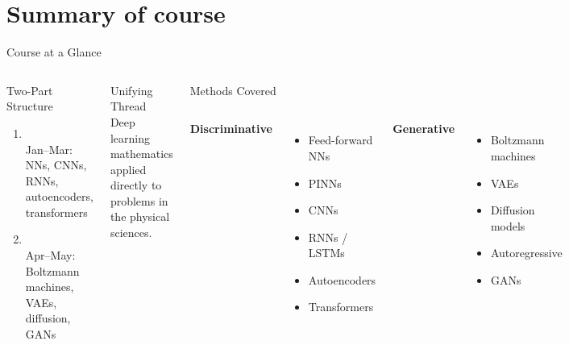 \documentclass[aspectratio=169,11pt]{beamer}
\begin{document}
\section{Summary of course}
\begin{frame}{Course at a Glance}
  \begin{columns}[T]
      \begin{block}{Two-Part Structure}
        \begin{enumerate}\itemsep2pt
          \item {}\\
                {\footnotesize Jan--Mar: NNs, CNNs, RNNs,
                autoencoders, transformers}
          \item {}\\
                {\footnotesize Apr--May: Boltzmann machines,
                VAEs, diffusion, GANs}
        \end{enumerate}
      \end{block}
      \vspace{3pt}
      \begin{alertblock}{Unifying Thread}
        Deep learning mathematics applied
        directly to problems in the physical sciences.
      \end{alertblock}
      \begin{block}{Methods Covered}
        \begin{columns}[T]
          {\small\textbf{Discriminative}}
          \begin{itemize}\small\itemsep1pt
            \item Feed-forward NNs
            \item PINNs
            \item CNNs
            \item RNNs / LSTMs
            \item Autoencoders
            \item Transformers
          \end{itemize}
          {\small\textbf{Generative}}
          \begin{itemize}\small\itemsep1pt
            \item Boltzmann machines
            \item VAEs
            \item Diffusion models
            \item Autoregressive
            \item GANs
          \end{itemize}
        \end{columns}
      \end{block}
  \end{columns}
\end{frame}
\end{document}
